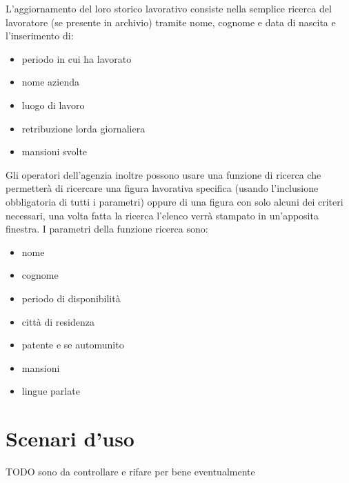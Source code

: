 \documentclass{article}
\begin{document}
    L'aggiornamento del loro storico lavorativo consiste nella semplice ricerca del lavoratore (se presente in archivio) tramite nome, cognome e data di nascita e l'inserimento di:

    \begin{itemize}
        \item periodo in cui ha lavorato
        \item nome azienda 
        \item luogo di lavoro
        \item retribuzione lorda giornaliera
        \item mansioni svolte
    \end{itemize}

    Gli operatori dell'agenzia inoltre possono usare una funzione di ricerca che permetterà di ricercare una figura lavorativa specifica (usando l'inclusione obbligatoria di tutti i parametri) oppure di una figura con solo alcuni dei criteri necessari, una volta fatta la ricerca l'elenco verrà stampato in un'apposita finestra. I parametri della funzione ricerca sono:

    \begin{itemize}
        \item nome
        \item cognome
        \item periodo di disponibilità
        \item città di residenza
        \item patente e se automunito
        \item mansioni
        \item lingue parlate
    \end{itemize}

    \section{Scenari d'uso}

    TODO sono da controllare e rifare per bene eventualmente
\end{document}
